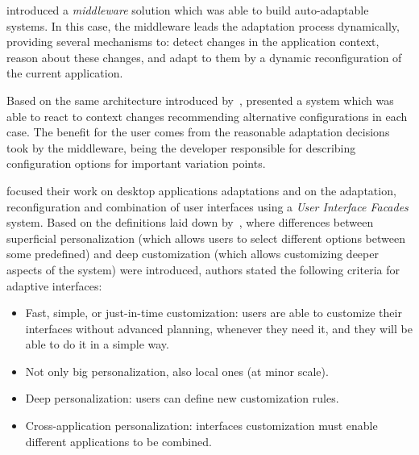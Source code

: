 \citet{nilsson_model_based_2006} introduced a \textit{middleware} solution
which was able to build auto-adaptable systems. In this case, the middleware 
leads the adaptation process dynamically, providing several mechanisms to: 
detect changes in the application context, reason about these changes, and adapt 
to them by a dynamic reconfiguration of the current application. 

Based on the same architecture introduced by~\citet{nilsson_model_based_2006},
\citet{hallsteinsen_self_adaptation_2004} presented a system which was able to 
react to context changes recommending alternative configurations in each case.
The benefit for the user comes from the reasonable adaptation decisions took 
by the middleware, being the developer responsible for describing configuration 
options for important variation points.

\citet{stuerzlinger_user_2006} focused their work on desktop applications
adaptations and on the adaptation, reconfiguration and combination of user
interfaces using a \textit{User Interface Facades} system. Based on the definitions
laid down by~\citet{marmolin_medium_1995}, where differences between superficial
personalization (which allows users to select different options between some
predefined) and deep customization (which allows customizing deeper aspects of
the system) were introduced, authors stated the following criteria for adaptive
interfaces:

\begin{itemize}
  \item Fast, simple, or just-in-time customization: users are able to customize
  their interfaces without advanced planning, whenever they need it, and they will
  be able to do it in a simple way.
  \item Not only big personalization, also local ones (at minor scale).
  \item Deep personalization: users can define new customization rules.
  \item Cross-application personalization: interfaces customization must enable 
  different applications to be combined.
\end{itemize}

